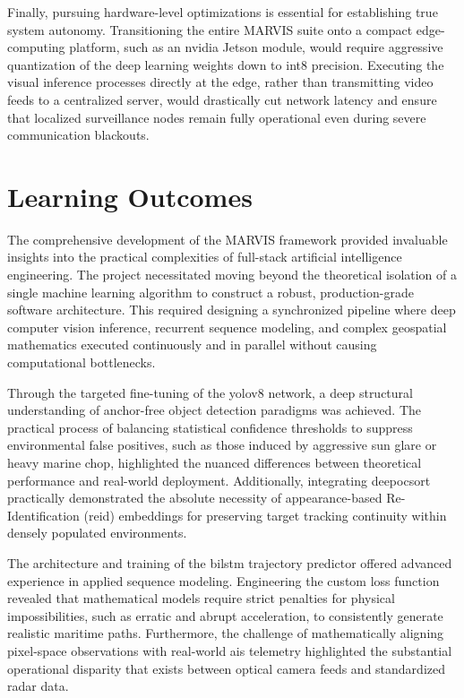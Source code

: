 Finally, pursuing hardware-level optimizations is essential for establishing true system autonomy. Transitioning the entire MARVIS suite onto a compact edge-computing platform, such as an \gls{nvidia} Jetson module, would require aggressive quantization of the deep learning weights down to \gls{int8} precision. Executing the visual inference processes directly at the edge, rather than transmitting video feeds to a centralized server, would drastically cut network latency and ensure that localized surveillance nodes remain fully operational even during severe communication blackouts.

\section{Learning Outcomes}


The comprehensive development of the MARVIS framework provided invaluable insights into the practical complexities of full-stack artificial intelligence engineering. The project necessitated moving beyond the theoretical isolation of a single machine learning algorithm to construct a robust, production-grade software architecture. This required designing a synchronized pipeline where deep computer vision inference, recurrent sequence modeling, and complex geospatial mathematics executed continuously and in parallel without causing computational bottlenecks.

Through the targeted fine-tuning of the \gls{yolov8} network, a deep structural understanding of anchor-free object detection paradigms was achieved. The practical process of balancing statistical confidence thresholds to suppress environmental false positives, such as those induced by aggressive sun glare or heavy marine chop, highlighted the nuanced differences between theoretical performance and real-world deployment. Additionally, integrating \gls{deepocsort} practically demonstrated the absolute necessity of appearance-based Re-Identification (\gls{reid}) embeddings for preserving target tracking continuity within densely populated environments.

The architecture and training of the \gls{bilstm} trajectory predictor offered advanced experience in applied sequence modeling. Engineering the custom loss function revealed that mathematical models require strict penalties for physical impossibilities, such as erratic and abrupt acceleration, to consistently generate realistic maritime paths. Furthermore, the challenge of mathematically aligning pixel-space observations with real-world \gls{ais} telemetry highlighted the substantial operational disparity that exists between optical camera feeds and standardized radar data.

